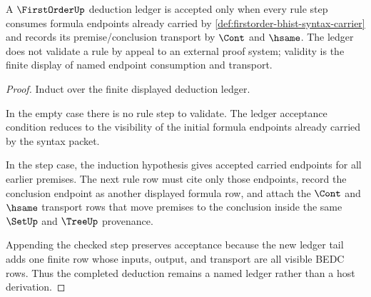 \begin{theorem}\label{thm:firstorder-deduction-soundness-ledger-obligation}
A $\FirstOrderUp$ deduction ledger is accepted only when every rule step
consumes formula endpoints already carried by
\autoref{def:firstorder-bhist-syntax-carrier} and records its
premise/conclusion transport by $\Cont$ and $\hsame$. The ledger does not
validate a rule by appeal to an external proof system; validity is the finite
display of named endpoint consumption and transport.
\end{theorem}
\begin{proof}
Induct over the finite displayed deduction ledger.

In the empty case there is no rule step to validate. The ledger acceptance
condition reduces to the visibility of the initial formula endpoints already
carried by the syntax packet.

In the step case, the induction hypothesis gives accepted carried endpoints
for all earlier premises. The next rule row must cite only those endpoints,
record the conclusion endpoint as another displayed formula row, and attach
the $\Cont$ and $\hsame$ transport rows that move premises to the conclusion
inside the same $\SetUp$ and $\TreeUp$ provenance.

Appending the checked step preserves acceptance because the new ledger tail
adds one finite row whose inputs, output, and transport are all visible BEDC
rows. Thus the completed deduction remains a named ledger rather than a host
derivation.
\end{proof}

